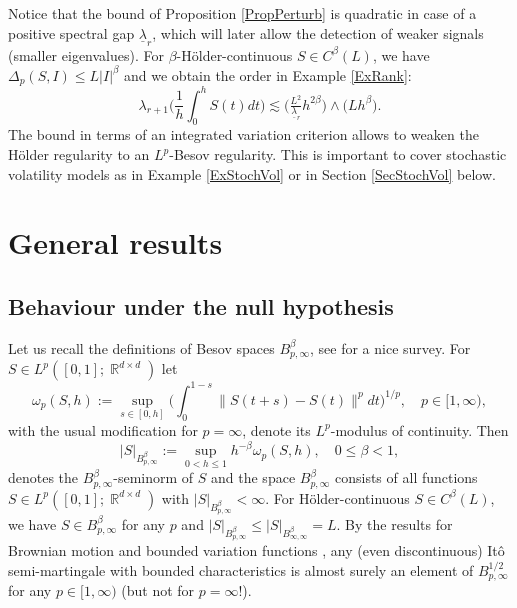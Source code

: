 \documentclass[preprint,aos]{imsart}
\numberwithin{equation}{section}
\theoremstyle{remark}
\DeclareMathOperator{\R}{{\mathbb R}}
\providecommand{\abs}[1]{\lvert #1 \rvert}
\providecommand{\norm}[1]{\lVert #1 \rVert}
\renewcommand{\le}{\leqslant}
\begin{document}
Notice that the bound of Proposition \ref{PropPerturb} is quadratic in case of a positive spectral gap $\underline\lambda_r$, which will later allow the detection of weaker signals (smaller eigenvalues).
For $\beta$-H\"older-continuous $S\in C^\beta(L)$, we have $\Delta_p(S,I)\le L\abs{I}^\beta$ and we obtain the order in Example \ref{ExRank}:
\[ \lambda_{r+1}\Big(\frac1{h}\int_0^h S(t)dt\Big) \lesssim \big(\tfrac{L^2}{\underline\lambda_r}h^{2\beta}\big)\wedge \big(Lh^\beta\big).\]
The bound in terms of an integrated variation criterion allows to weaken the H\"older regularity to an $L^p$-Besov regularity. This is important to cover stochastic volatility models as in Example \ref{ExStochVol} or in Section \ref{SecStochVol} below.


\section{\bf General results}\label{SecResults}

\subsection{\bf Behaviour under the null hypothesis}

Let us recall the definitions of Besov spaces $B^\beta_{p,\infty}$, see \cite{Cohen2003} for a nice survey. For $S\in L^p([0,1];\R^{d\times d})$ let
\[ \omega_p(S,h):=\sup_{s\in[0,h]}\Big(\int_0^{1-s}\norm{S(t+s)-S(t)}^pdt\Big)^{1/p},\quad p\in[1,\infty),\]
with the usual modification for $p=\infty$, denote its $L^p$-modulus of continuity. Then
\[ \abs{S}_{B^\beta_{p,\infty}}:=\sup_{0<h\le 1} h^{-\beta}\omega_p(S,h),\quad 0\le \beta<1,\]
denotes the $B^\beta_{p,\infty}$-seminorm of $S$ and the space $B^\beta_{p,\infty}$ consists of all functions $S\in L^p([0,1];\R^{d\times d})$ with $\abs{S}_{B^\beta_{p,\infty}}<\infty$. For H\"older-continuous $S\in C^\beta(L)$, we have $S\in B^\beta_{p,\infty}$  for any $p$ and $\abs{S}_{B^\beta_{p,\infty}}\le \abs{S}_{B^\beta_{\infty,\infty}}=L$. By the results for Brownian motion \citep{CiesEtal1993} and bounded variation functions \citep{Cohen2003}, any (even discontinuous) It\^o semi-martingale with bounded characteristics is almost surely an element of $B^{1/2}_{p,\infty}$ for any $p\in[1,\infty)$ (but not for $p=\infty$!).
\end{document}
